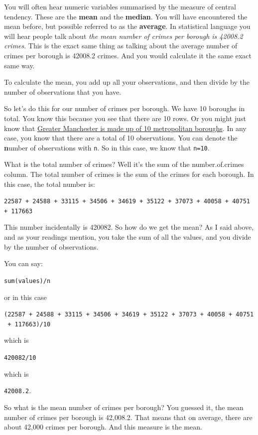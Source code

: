 \documentclass[]{book}
\theoremstyle{definition}
\theoremstyle{definition}
\theoremstyle{definition}
\theoremstyle{remark}
\begin{document}
You will often hear numeric variables summarised by the measure of
central tendency. These are the \textbf{mean} and the \textbf{median}.
You will have encountered the mean before, but possible referred to as
the \textbf{average}. In statistical language you will hear people talk
about \emph{the mean number of crimes per borough is 42008.2 crimes}.
This is the exact same thing as talking about the average number of
crimes per borough is 42008.2 crimes. And you would calculate it the
same exact same way.

To calculate the mean, you add up all your observations, and then divide
by the number of observations that you have.

So let's do this for our number of crimes per borough. We have 10
boroughs in total. You know this because you see that there are 10 rows.
Or you might just know that
\href{https://www.britannica.com/place/Greater-Manchester}{Greater
Manchester is made up of 10 metropolitan boroughs}. In any case, you
know that there are a total of 10 observations. You can denote the
\textbf{n}umber of observations with \texttt{n}. So in this case, we
know that \texttt{n=10}.

What is the total number of crimes? Well it's the sum of the
number.of.crimes column. The total number of crimes is the sum of the
crimes for each borough. In this case, the total number is:

\texttt{22587\ +\ 24588\ +\ 33115\ +\ 34506\ +\ 34619\ +\ 35122\ +\ 37073\ +\ 40058\ +\ 40751\ +\ 117663}

This number incidentally is 420082. So how do we get the mean? As I said
above, and as your readings mention, you take the sum of all the values,
and you divide by the number of observations.

You can say:

\texttt{sum(values)/n}

or in this case

\texttt{(22587\ +\ 24588\ +\ 33115\ +\ 34506\ +\ 34619\ +\ 35122\ +\ 37073\ +\ 40058\ +\ 40751\ +\ 117663)/10}

which is

\texttt{420082/10}

which is

\texttt{42008.2}.

So what is the mean number of crimes per borough? You guessed it, the
mean number of crimes per borough is 42,008.2. That means that on
average, there are about 42,000 crimes per borough. And this measure is
the mean.
\end{document}
